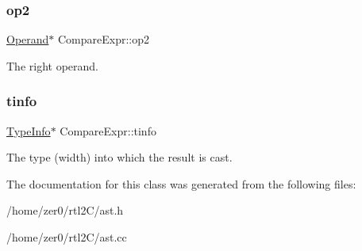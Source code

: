 \subsubsection{\texorpdfstring{op2}{op2}}
{\footnotesize\ttfamily \hyperlink{class_operand}{Operand}$\ast$ Compare\+Expr\+::op2\hspace{0.3cm}{\ttfamily [protected]}}

The right operand. \mbox{\label{class_compare_expr_a023d7d23d623b0f2545756e2ffbae522}} 
\subsubsection{\texorpdfstring{tinfo}{tinfo}}
{\footnotesize\ttfamily \hyperlink{class_type_info}{Type\+Info}$\ast$ Compare\+Expr\+::tinfo\hspace{0.3cm}{\ttfamily [protected]}}

The type (width) into which the result is cast. 

The documentation for this class was generated from the following files\+:\begin{DoxyCompactItemize}
\item 
/home/zer0/rtl2\+C/ast.\+h\item 
/home/zer0/rtl2\+C/ast.\+cc\end{DoxyCompactItemize}
